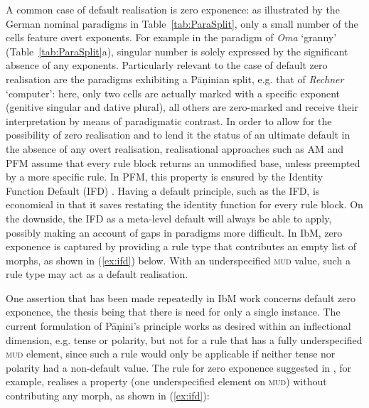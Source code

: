 \documentclass[output=paper
	        ,collection
	        ,collectionchapter
 	        ,biblatex
                ,babelshorthands
                ,newtxmath
                ,draftmode
                ,colorlinks, citecolor=brown
]{langscibook}
\begin{document}
\begin{exe}
\begin{xlist}
\begin{exe}
\begin{xlist}
\begin{exe}
\end{exe}

A common case of default realisation is zero exponence: as illustrated
by the German nominal paradigms in Table~\ref{tab:ParaSplit}, only a
small number of the cells feature overt exponents. For example in the paradigm
of \textit{Oma} `granny' (Table~\ref{tab:ParaSplit}a), singular number
is solely expressed by the significant absence of any
exponents. Particularly relevant to the case of default zero
realisation are the paradigms exhibiting a Pāṇinian split, e.g. that
of \textit{Rechner} `computer': here, only two cells are actually
marked with a specific exponent (genitive singular and dative plural),
all others are zero-marked and receive their interpretation by means
of paradigmatic contrast. In order to allow for the possibility of
zero realisation and to lend it the status of an ultimate default in
the absence of any overt realisation, realisational approaches such as
AM and PFM assume that every rule block returns an unmodified base,
unless preempted by a more specific rule. In PFM, this property is
ensured by the Identity Function Default (IFD)
\citep[][53]{Stump01}. Having a default principle, such as the IFD, is
economical in that it saves restating the identity function for every
rule block. On the downside, the IFD as a meta-level default 
will always be able to apply, possibly making an account of gaps in
paradigms more difficult. In IbM, zero exponence is captured by
providing a rule type that contributes an empty list of morphs, as
shown in (\ref{ex:ifd}) below. With an underspecified \textsc{mud}
value, such a rule type may act as a default realisation.

One assertion that has been made repeatedly in IbM work concerns
default zero exponence, the thesis being that there is need for only a
single instance. The current formulation of Pāṇini's principle works
as desired within an inflectional dimension, e.g. tense or polarity,
but not for a rule that has a fully underspecified \textsc{mud}
element, since such a rule would only be applicable if neither tense
nor polarity had a non-default value.  The rule for zero exponence
suggested in \citet{Crysmann:Bonami:2016}, for example, realises a
property (one underspecified element on \textsc{mud}) without
contributing any morph, as shown in (\ref{ex:ifd}):

\begin{exe}
  \ex \label{ex:ifd}
\end{exe}


\end{xlist}
\end{exe}
\end{xlist}
\end{exe}
\end{document}
